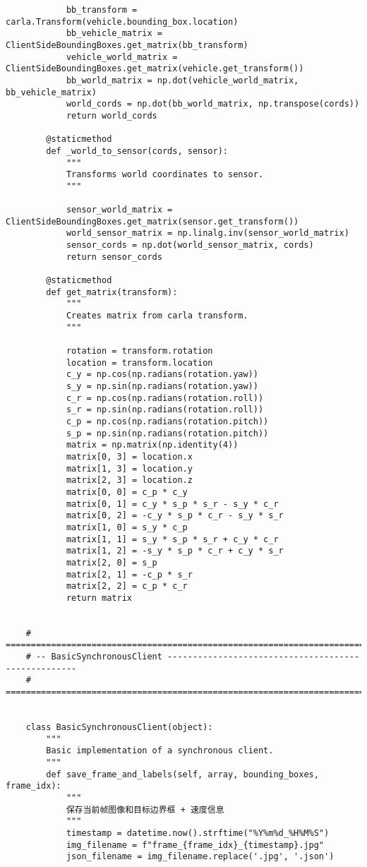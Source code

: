 \begin{lstlisting}
	        bb_transform = carla.Transform(vehicle.bounding_box.location)
	        bb_vehicle_matrix = ClientSideBoundingBoxes.get_matrix(bb_transform)
	        vehicle_world_matrix = ClientSideBoundingBoxes.get_matrix(vehicle.get_transform())
	        bb_world_matrix = np.dot(vehicle_world_matrix, bb_vehicle_matrix)
	        world_cords = np.dot(bb_world_matrix, np.transpose(cords))
	        return world_cords
	
	    @staticmethod
	    def _world_to_sensor(cords, sensor):
	        """
	        Transforms world coordinates to sensor.
	        """
	
	        sensor_world_matrix = ClientSideBoundingBoxes.get_matrix(sensor.get_transform())
	        world_sensor_matrix = np.linalg.inv(sensor_world_matrix)
	        sensor_cords = np.dot(world_sensor_matrix, cords)
	        return sensor_cords
	
	    @staticmethod
	    def get_matrix(transform):
	        """
	        Creates matrix from carla transform.
	        """
	
	        rotation = transform.rotation
	        location = transform.location
	        c_y = np.cos(np.radians(rotation.yaw))
	        s_y = np.sin(np.radians(rotation.yaw))
	        c_r = np.cos(np.radians(rotation.roll))
	        s_r = np.sin(np.radians(rotation.roll))
	        c_p = np.cos(np.radians(rotation.pitch))
	        s_p = np.sin(np.radians(rotation.pitch))
	        matrix = np.matrix(np.identity(4))
	        matrix[0, 3] = location.x
	        matrix[1, 3] = location.y
	        matrix[2, 3] = location.z
	        matrix[0, 0] = c_p * c_y
	        matrix[0, 1] = c_y * s_p * s_r - s_y * c_r
	        matrix[0, 2] = -c_y * s_p * c_r - s_y * s_r
	        matrix[1, 0] = s_y * c_p
	        matrix[1, 1] = s_y * s_p * s_r + c_y * c_r
	        matrix[1, 2] = -s_y * s_p * c_r + c_y * s_r
	        matrix[2, 0] = s_p
	        matrix[2, 1] = -c_p * s_r
	        matrix[2, 2] = c_p * c_r
	        return matrix
	
	
	# ==============================================================================
	# -- BasicSynchronousClient ----------------------------------------------------
	# ==============================================================================
	
	
	class BasicSynchronousClient(object):
	    """
	    Basic implementation of a synchronous client.
	    """
	    def save_frame_and_labels(self, array, bounding_boxes, frame_idx):
	        """
	        保存当前帧图像和目标边界框 + 速度信息
	        """
	        timestamp = datetime.now().strftime("%Y%m%d_%H%M%S")
	        img_filename = f"frame_{frame_idx}_{timestamp}.jpg"
	        json_filename = img_filename.replace('.jpg', '.json')
	

\end{lstlisting}

